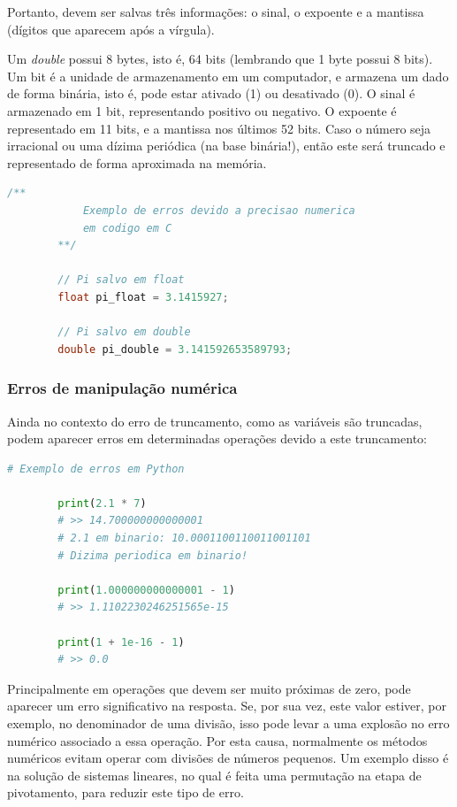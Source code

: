     Portanto, devem ser salvas três informações: o sinal, o expoente e a mantissa (dígitos que aparecem após a vírgula).

    Um \textit{double} possui 8 bytes, isto é, 64 bits (lembrando que 1 byte possui 8 bits). Um bit é a unidade de armazenamento em um computador, e armazena um dado de forma binária, isto é, pode estar ativado (1) ou desativado (0). O sinal é armazenado em 1 bit, representando positivo ou negativo. O expoente é representado em 11 bits, e a mantissa nos últimos 52 bits. Caso o número seja irracional ou uma dízima periódica (na base binária!), então este será truncado e representado de forma aproximada na memória.

     \begin{lstlisting}[language=C++]
        /**
            Exemplo de erros devido a precisao numerica
            em codigo em C
        **/

        // Pi salvo em float
        float pi_float = 3.1415927;

        // Pi salvo em double
        double pi_double = 3.141592653589793;

    \end{lstlisting}

    \subsubsection*{Erros de manipulação numérica}

    Ainda no contexto do erro de truncamento, como as variáveis são truncadas, podem aparecer erros em determinadas operações devido a este truncamento:

    \begin{lstlisting}[language=Python]
        # Exemplo de erros em Python

        print(2.1 * 7)
        # >> 14.700000000000001
        # 2.1 em binario: 10.0001100110011001101
        # Dizima periodica em binario!

        print(1.000000000000001 - 1)
        # >> 1.1102230246251565e-15
        
        print(1 + 1e-16 - 1)
        # >> 0.0

    \end{lstlisting}

    Principalmente em operações que devem ser muito próximas de zero, pode aparecer um erro significativo na resposta. Se, por sua vez, este valor estiver, por exemplo, no denominador de uma divisão, isso pode levar a uma explosão no erro numérico associado a essa operação. Por esta causa, normalmente os métodos numéricos evitam operar com divisões de números pequenos. Um exemplo disso é na solução de sistemas lineares, no qual é feita uma permutação na etapa de pivotamento, para reduzir este tipo de erro.

